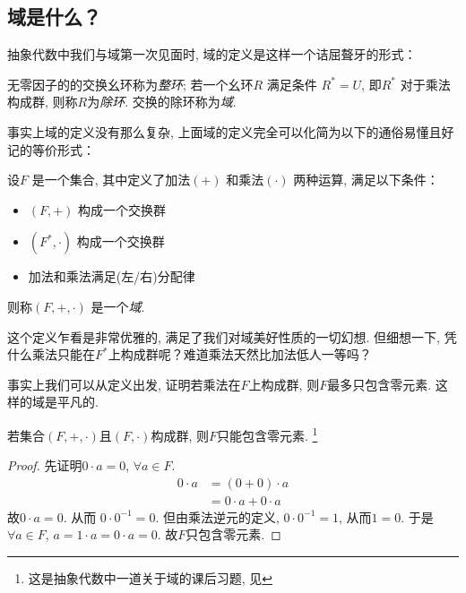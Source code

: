 \subsection{域是什么？}

抽象代数中我们与域第一次见面时, 域的定义是这样一个诘屈聱牙的形式：
\begin{definition}
    无零因子的的交换幺环称为\emph{整环}; 若一个幺环\(R\) 满足条件
    \(R^{*}=U\), 即\(R^{*}\) 对于乘法构成群, 则称\(R\)为\emph{除环}.
    交换的除环称为\emph{域}.
\end{definition}
事实上域的定义没有那么复杂, 上面域的定义完全可以化简为以下的通俗易懂且好记的等价形式：
\begin{definition}
    设\(F\) 是一个集合, 其中定义了加法\((+)\) 和乘法\((\cdot)\) 两种运算, 满足以下条件：
    \begin{itemize}
        \item \((F, +)\) 构成一个交换群
        \item \((F^{*}, \cdot)\) 构成一个交换群
        \item 加法和乘法满足(左/右)分配律
    \end{itemize}
    则称\((F, +, \cdot)\) 是一个\emph{域}.
\end{definition}

这个定义乍看是非常优雅的, 满足了我们对域美好性质的一切幻想. 但细想一下,
凭什么乘法只能在\(F^{*}\)上构成群呢？难道乘法天然比加法低人一等吗？

事实上我们可以从定义出发, 证明若乘法在\(F\)上构成群, 则\(F\)最多只包含零元素. 这样的域是平凡的.

\begin{theorem}
    若集合\((F, +,
    \cdot)\)且\((F,\cdot)\)构成群, 则\(F\)只能包含零元素.
    \footnote{这是抽象代数中一道关于域的课后习题, 见}
\end{theorem}
\begin{proof}
    先证明\(0 \cdot a=0\), \(\forall a \in F\).
    \begin{align*}
        0 \cdot a &= (0+0) \cdot a\\
        &= 0 \cdot a + 0 \cdot a
    \end{align*}
    故\(0 \cdot a=0\). 从而 \(0\cdot 0^{-1}=0\).
    但由乘法逆元的定义,  \(0 \cdot 0^{-1}=1\), 从而\(1=0\).
    于是\(\forall a \in F\), \(a=1 \cdot a=0 \cdot a=0\).
    故\(F\)只包含零元素.
\end{proof}

